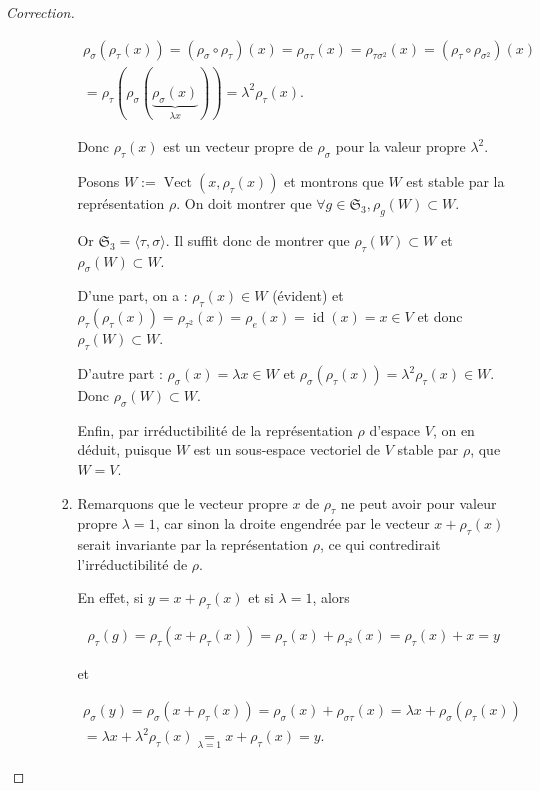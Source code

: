 \documentclass[french]{book}
\theoremstyle{definition}
\begin{document}
\begin{proof}[Correction]
\begin{enumerate}
\begin{enumerate}
\begin{enumerate}
        \begin{gather*}
          \rho _{\sigma}(\rho _{\tau}(x)) = (\rho _{\sigma} \circ \rho _{\tau})(x) = \rho _{\sigma \tau}(x) = \rho _{\tau \sigma ^2}(x) = (\rho _{\tau} \circ \rho _{\sigma ^2})(x) \\
          = \rho _{\tau}(\rho _{\sigma}( \underbrace{\rho _{\sigma}(x)}_{\lambda x})) = \lambda ^2 \rho _{\tau}(x).
        \end{gather*}

        Donc \(\rho _{\tau}(x)\) est un vecteur propre de \(\rho _{\sigma}\) pour la valeur propre \(\lambda ^2\).

        Posons \(W := \operatorname{Vect}(x, \rho _{\tau}(x))\) et montrons que \(W\) est stable par la représentation \(\rho\). On doit montrer que \(\forall g \in \mathfrak{S}_{3}, \rho _{g}(W) \subset W\).

        Or \(\mathfrak{S}_{3} = \langle \tau, \sigma \rangle\). Il suffit donc de montrer que \(\rho _{\tau}(W) \subset W\) et \(\rho _{\sigma}(W) \subset W\).

        D'une part, on a : \(\rho _{\tau}(x) \in W\) (évident) et \(\rho _{\tau}(\rho _{\tau}(x)) = \rho _{\tau ^2}(x) = \rho _{e}(x) = \operatorname{id}(x) =x \in V\) et donc \(\rho _{\tau}(W) \subset W\).

        D'autre part : \(\rho _{\sigma}(x) = \lambda x \in W\) et \(\rho _{\sigma}(\rho _{\tau}(x)) = \lambda ^2 \rho _{\tau}(x)\in W\). Donc \(\rho _{\sigma}(W) \subset W\).

        Enfin, par irréductibilité de la représentation \(\rho\) d'espace \(V\), on en déduit, puisque \(W\) est un sous-espace vectoriel de \(V\) stable par \(\rho\), que \(W = V\).
        \item Remarquons que le vecteur propre \(x\) de \(\rho _{\tau}\) ne peut avoir pour valeur propre \(\lambda = 1\), car sinon la droite engendrée par le vecteur \(x+ \rho _{\tau}(x)\) serait invariante par la représentation \(\rho\), ce qui contredirait l'irréductibilité de \(\rho\).

        En effet, si \(y = x+ \rho _{\tau}(x)\) et si \(\lambda = 1\), alors

        \begin{gather*}
          \rho _{\tau}(g) = \rho _{\tau}(x+ \rho _{\tau}(x)) = \rho _{\tau}(x)+ \rho _{\tau ^2}(x) = \rho _{\tau}(x)+x=y
        \end{gather*}

        et

        \begin{gather*}
          \rho _{\sigma}(y) = \rho _{\sigma}(x+ \rho _{\tau}(x)) = \rho _{\sigma}(x) + \rho _{\sigma \tau}(x) = \lambda x + \rho _{\sigma}(\rho _{\tau}(x)) \\
          = \lambda x + \lambda ^2 \rho _{\tau}(x) \underset{\lambda=1}{=} x + \rho _{\tau}(x) = y.
        \end{gather*}


\end{enumerate}
\end{enumerate}
\end{enumerate}
\end{proof}
\end{document}
